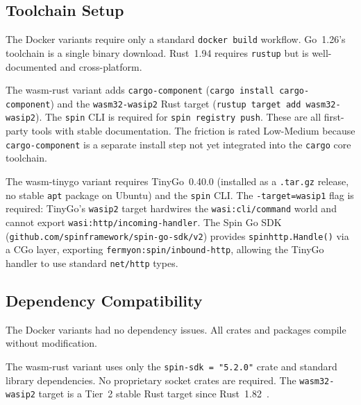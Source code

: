 \subsection{Toolchain Setup}

\begin{sloppypar}
The Docker variants require only a standard \texttt{docker build} workflow. Go~1.26's toolchain is a single binary download. Rust~1.94 requires \texttt{rustup} but is well-documented and cross-platform.
\end{sloppypar}

\begin{sloppypar}
The wasm-rust variant adds \texttt{cargo-component} (\texttt{cargo install cargo-component}) and the \texttt{wasm32-wasip2} Rust target (\texttt{rustup target add wasm32-wasip2}). The \texttt{spin} \acs{CLI} is required for \texttt{spin registry push}. These are all first-party tools with stable documentation. The friction is rated Low-Medium because \texttt{cargo-component} is a separate install step not yet integrated into the \texttt{cargo} core toolchain.
\end{sloppypar}

\begin{sloppypar}
The wasm-tinygo variant requires TinyGo~0.40.0 (installed as a \texttt{.tar.gz} release, no stable \texttt{apt} package on Ubuntu) and the \texttt{spin} \acs{CLI}. The \texttt{-target=wasip1} flag is required: TinyGo's \texttt{wasip2} target hardwires the \texttt{wasi:cli/command} world and cannot export \texttt{wasi:http/incoming-handler}. The Spin Go \acs{SDK} (\texttt{github.com/spinframework/spin-go-sdk/v2}) provides \texttt{spinhttp.Handle()} via a \acs{CGo} layer, exporting \texttt{fermyon:spin/inbound-http}, allowing the TinyGo handler to use standard \texttt{net/http} types.
\end{sloppypar}

\subsection{Dependency Compatibility}

The Docker variants had no dependency issues. All crates and packages compile without modification.

\begin{sloppypar}
The wasm-rust variant uses only the \texttt{spin-sdk~=~"5.2.0"} crate and standard library dependencies. No proprietary socket crates are required. The \texttt{wasm32-wasip2} target is a Tier~2 stable Rust target since Rust~1.82~\cite{rustblogwasip2}.
\end{sloppypar}

